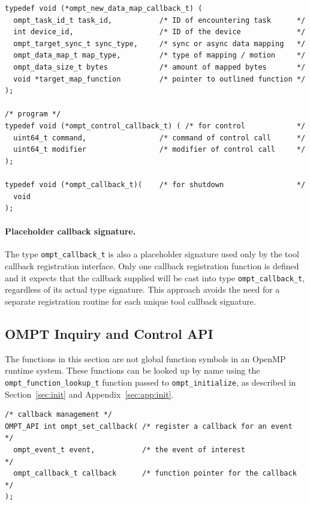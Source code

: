 \documentclass{article}
\begin{document}
{\begin{verbatim}
typedef void (*ompt_new_data_map_callback_t) (
  ompt_task_id_t task_id,           /* ID of encountering task      */
  int device_id,                    /* ID of the device             */
  ompt_target_sync_t sync_type,     /* sync or async data mapping   */
  ompt_data_map_t map_type,         /* type of mapping / motion     */
  ompt_data_size_t bytes            /* amount of mapped bytes       */
  void *target_map_function         /* pointer to outlined function */
);

/* program */						   
typedef void (*ompt_control_callback_t) ( /* for control            */	   
  uint64_t command,                 /* command of control call      */
  uint64_t modifier                 /* modifier of control call     */
);
  
typedef void (*ompt_callback_t)(    /* for shutdown                 */	
  void
); 
\end{verbatim}

\paragraph{Placeholder callback signature.} The type \verb|ompt_callback_t| is also a placeholder signature used only by the tool callback registration interface. 
Only one callback registration function is defined and it expects that the callback supplied will be cast into type \verb|ompt_callback_t|, regardless of its actual type signature. This approach avoids the need for a separate registration routine for each unique tool callback signature. 

\clearpage
\subsection{OMPT Inquiry and Control API}

The functions in this section are not global function symbols in an OpenMP runtime system. These functions can be looked up by name using the \verb|ompt_function_lookup_t| function passed to \verb|ompt_initialize|, as described in Section~\ref{sec:init} and Appendix~\ref{sec:app:init}.

\begin{verbatim}
/* callback management */
OMPT_API int ompt_set_callback( /* register a callback for an event                      */
  ompt_event_t event,           /* the event of interest                                 */
  ompt_callback_t callback      /* function pointer for the callback                     */
);


\end{verbatim}}
\end{document}
